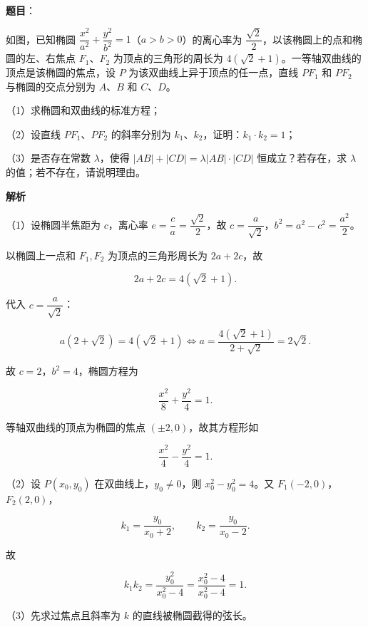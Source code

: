\begin{answer}

\textbf{题目}：

如图，已知椭圆 $\dfrac{x^2}{a^2}+\dfrac{y^2}{b^2}=1$（$a>b>0$）的离心率为 $\dfrac{\sqrt2}2$，以该椭圆上的点和椭圆的左、右焦点 $F_1$、$F_2$ 为顶点的三角形的周长为 $4(\sqrt2+1)$。一等轴双曲线的顶点是该椭圆的焦点，设 $P$ 为该双曲线上异于顶点的任一点，直线 $PF_1$ 和 $PF_2$ 与椭圆的交点分别为 $A$、$B$ 和 $C$、$D$。

（1）求椭圆和双曲线的标准方程；

（2）设直线 $PF_1$、$PF_2$ 的斜率分别为 $k_1$、$k_2$，证明：$k_1\cdot k_2=1$；

（3）是否存在常数 $\lambda$，使得 $|AB|+|CD|=\lambda|AB|\cdot|CD|$ 恒成立？若存在，求 $\lambda$ 的值；若不存在，请说明理由。
\nopagebreak[4]
\begin{center}\end{center}
\nopagebreak[4]
\textbf{解析}

（1）设椭圆半焦距为 $c$，离心率 $e=\dfrac c a=\dfrac{\sqrt2}2$，故 $c=\dfrac a{\sqrt2}$，$b^2=a^2-c^2=\dfrac{a^2}2$。

以椭圆上一点和 $F_1,F_2$ 为顶点的三角形周长为 $2a+2c$，故

\nopagebreak[4]
\[2a+2c=4(\sqrt2+1).\]

代入 $c=\dfrac a{\sqrt2}$：

\nopagebreak[4]
\[a\left(2+\sqrt2\right)=4(\sqrt2+1)
\iff a=\frac{4(\sqrt2+1)}{2+\sqrt2}=2\sqrt2.\]

故 $c=2$，$b^2=4$，椭圆方程为

\nopagebreak[4]
\[\frac{x^2}{8}+\frac{y^2}{4}=1.\]

等轴双曲线的顶点为椭圆的焦点 $(\pm2,0)$，故其方程形如

\nopagebreak[4]
\[\frac{x^2}{4}-\frac{y^2}{4}=1.\]

（2）设 $P(x_0,y_0)$ 在双曲线上，$y_0\neq0$，则 $x_0^2-y_0^2=4$。又 $F_1(-2,0)$，$F_2(2,0)$，

\nopagebreak[4]
\[k_1=\frac{y_0}{x_0+2},\qquad k_2=\frac{y_0}{x_0-2}.\]

故

\nopagebreak[4]
\[k_1k_2=\frac{y_0^2}{x_0^2-4}
=\frac{x_0^2-4}{x_0^2-4}=1.\]

（3）先求过焦点且斜率为 $k$ 的直线被椭圆截得的弦长。


\end{answer}
